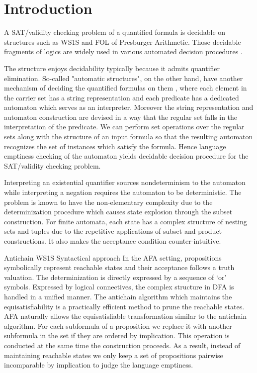 \section{Introduction}

A SAT/validity checking problem of a quantified formula is decidable on
structures such as WS1S and FOL of Presburger Arithmetic. Those decidable
fragments of logics are widely used in various automated decision
procedures \cite{KlaEtAl:Mona}.

The structure enjoys decidability typically because it admits quantifier
elimination. So-called "automatic structures", on the other hand, have another
mechanism of deciding the quantified formulas on them \cite{}, where each element
in the carrier set has a string representation and each predicate has a
dedicated automaton which serves as an interpreter. Moreover the string
representation and automaton construction are devised in a way that the regular
set falls in the interpretation of the predicate.  We can perform set
operations over the regular sets along with the structure of an input formula so
that the resulting automaton recognizes the set of instances which satisfy the
formula. Hence language emptiness checking of the automaton yields decidable
decision procedure for the SAT/validity checking problem.

 Interpreting an existential quantifier sources nondeterminism to
the automaton while interpreting a negation requires the automaton to be
deterministic. The problem is known to have the non-elementary complexity due to
the determinization procedure which causes state explosion through the subset
construction. For finite automata, each state has a complex structure of nesting
sets and tuples due to the repetitive applications of subset and product
constructions. It also makes the acceptance condition counter-intuitive.

 Antichain WS1S \cite{Fiedor2015,Fiedor2017}
 Syntactical approach \cite{Traytel15,TraytelN15}
In the AFA setting, propositions symbolically represent reachable states and
their acceptance follows a truth valuation. The determinization is directly
expressed by a sequence of `or' symbols. Expressed by logical connectives, the
complex structure in DFA is handled in a unified manner. The antichain algorithm
which maintains the equisatisfiability is a practically efficient method to
prune the reachable states. AFA naturally allows the equisatisfiable
transformation similar to the antichain algorithm. For each subformula of a
proposition we replace it with another subformula in the set if they are ordered
by implication. This operation is conducted at the same time the construction
proceeds. As a result, instead of maintaining reachable states we only keep a
set of propositions pairwise incomparable by implication to judge the language
emptiness.

